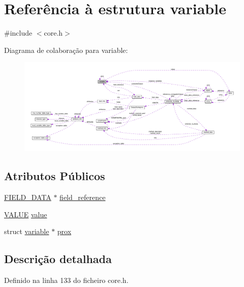 \hypertarget{structvariable}{\section{Referência à estrutura variable}
\label{structvariable}
}


{\ttfamily \#include $<$core.\-h$>$}



Diagrama de colaboração para variable\-:\nopagebreak
\begin{figure}[H]
\begin{center}
\leavevmode
\includegraphics[width=350pt]{structvariable__coll__graph}
\end{center}
\end{figure}
\subsection*{Atributos Públicos}
\begin{DoxyCompactItemize}
\item 
\hyperlink{core_8h_ad5537b62ac62d6b7f34e2303f2b84982}{F\-I\-E\-L\-D\-\_\-\-D\-A\-T\-A} $\ast$ \hyperlink{structvariable_a49911b2c89f7f4e785091675963a3cbd}{field\-\_\-reference}
\item 
\hyperlink{core_8h_ad5d0e2bb91a9e28f920452e088b6462b}{V\-A\-L\-U\-E} \hyperlink{structvariable_a163435f346185d4f2d8d05a78dde5bef}{value}
\item 
struct \hyperlink{structvariable}{variable} $\ast$ \hyperlink{structvariable_aac55069e8378041cc5049f83410d1b5d}{prox}
\end{DoxyCompactItemize}


\subsection{Descrição detalhada}


Definido na linha 133 do ficheiro core.\-h.



